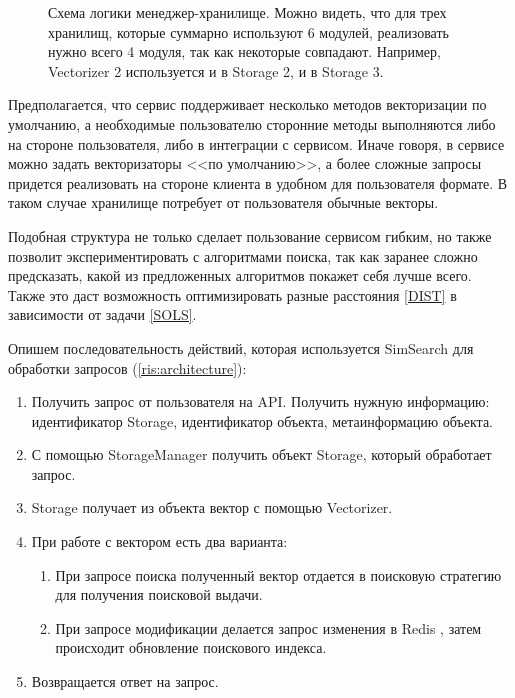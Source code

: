 \documentclass[a4paper,12pt]{extarticle}
\begin{document}
\begin{center}
\begin{figure}[H]
\caption{Схема логики менеджер-хранилище. Можно видеть, что для трех хранилищ, которые суммарно используют 6 модулей, реализовать нужно всего 4 модуля, так как некоторые совпадают. Например, Vectorizer 2 используется и в Storage 2, и в Storage 3.}
\label{ris:manager_storage}
\end{figure}
\end{center}

Предполагается, что сервис поддерживает несколько методов векторизации по умолчанию, а необходимые пользователю сторонние методы выполняются либо на стороне пользователя, либо в интеграции с сервисом. Иначе говоря, в сервисе можно задать векторизаторы <<по умолчанию>>, а более сложные запросы придется реализовать на стороне клиента в удобном для пользователя формате. В таком случае хранилище потребует от пользователя обычные векторы.

Подобная структура не только сделает пользование сервисом гибким, но также позволит экспериментировать с алгоритмами поиска, так как заранее сложно предсказать, какой из предложенных алгоритмов покажет себя лучше всего. Также это даст возможность оптимизировать разные расстояния \ref{DIST} в зависимости от задачи \ref{SOLS}.

Опишем последовательность действий, которая используется SimSearch для обработки запросов (\cref{ris:architecture}):

\begin{enumerate}
\item Получить запрос от пользователя на API. Получить нужную информацию: идентификатор Storage, идентификатор объекта, метаинформацию объекта.
\item С помощью StorageManager получить объект Storage, который обработает запрос.
\item Storage получает из объекта вектор с помощью Vectorizer.
\item При работе с вектором есть два варианта:
\begin{enumerate}
\item При запросе поиска полученный вектор отдается в поисковую стратегию для получения поисковой выдачи.
\item При запросе модификации делается запрос изменения в Redis \cite{redis}, затем происходит обновление поискового индекса.
\end{enumerate}
\item Возвращается ответ на запрос.
\end{enumerate}
\end{document}
